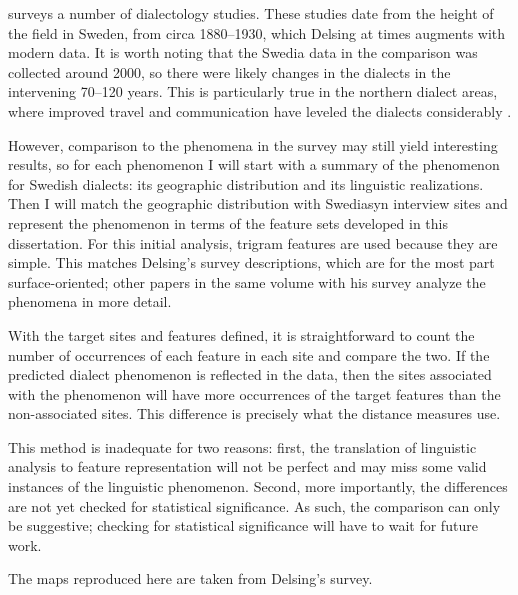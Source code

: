  surveys a number of dialectology studies. These
studies date from the height of the field in Sweden, from circa
1880--1930, which Delsing at times augments with modern data. It is
worth noting that the Swedia data in the comparison was collected
around 2000, so there were likely changes in the dialects in the
intervening 70--120 years. This is particularly true in the northern
dialect areas, where improved travel and communication have
leveled the dialects considerably \cite{hallberg05}.

However, comparison to the phenomena in the survey may still yield
interesting results, so for each
phenomenon I will start with a summary of the phenomenon for Swedish
dialects: its geographic distribution and its linguistic
realizations. Then I will match the geographic distribution with
Swediasyn interview sites and represent the phenomenon in terms of the
feature sets developed in this dissertation. For this initial
analysis, trigram features are used because they are simple. This
matches Delsing's survey descriptions, which are for the most part
surface-oriented; other papers in the same volume with his survey
analyze the phenomena in more detail.

With the target sites and features defined, it is straightforward to count the
number of occurrences of each feature in each site and compare the
two. If the predicted dialect phenomenon is reflected in the data,
then the sites associated with the phenomenon will have more
occurrences of the target features than the non-associated sites. This
difference is precisely what the distance measures use.

This method is inadequate for two reasons: first, the translation of
linguistic analysis to feature representation will not be perfect and
may miss some valid instances of the linguistic phenomenon. Second,
more importantly, the differences are not yet checked for statistical
significance. As such, the comparison can only be suggestive;
checking for statistical significance will have to wait for future
work.


The maps reproduced here are taken from Delsing's survey.


